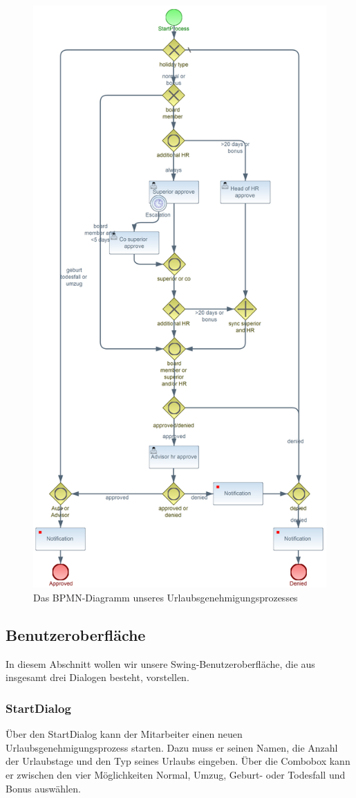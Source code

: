 \begin{figure}[H]
\centering
\includegraphics[width=0.75\linewidth]{Bilder/Urlaubsantrag}
\caption{Das BPMN-Diagramm unseres Urlaubsgenehmigungsprozesses}
\label{fig:Urlaubsantrag}
\end{figure}


\subsection{Benutzeroberfläche}
In diesem Abschnitt wollen wir unsere Swing-Benutzeroberfläche, die aus insgesamt drei Dialogen besteht, vorstellen.

\subsubsection{StartDialog}
Über den StartDialog kann der Mitarbeiter einen neuen Urlaubsgenehmigungsprozess starten. Dazu muss er seinen Namen, die Anzahl der Urlaubstage und den Typ seines Urlaubs eingeben. Über die Combobox kann er zwischen den vier Möglichkeiten Normal, Umzug, Geburt- oder Todesfall und Bonus auswählen.


